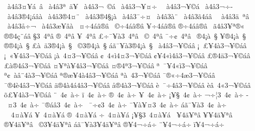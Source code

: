 {^^a0^^e04^^e23^^a4^^a5^^e1^^a0^^ad^^e2
^^a0^^e04^^e23^^aa^^a0^^e4^^a5
^^a0^^e04^^e23^^ac^^a0^^a9^^e1
^^a0^^e04^^e23^^ac^^a5^^a4^^f7^^a0
^^a0^^e04^^e23^^ac^^a5^^a9^^e1
^^a0^^e04^^e23^^ac^^f7^^ad
^^a0^^e04^^e23^^ae4^^a1^^e1^^e2^^e0
^^a0^^e04^^e23^^ae4^^a4^^a8^^ad
^^a0^^e04^^e23^^ae4^^a7^^a1^^e0
^^a0^^e04^^e23^^af^^f7^^a4
^^a0^^e04^^e23^^e0^^a8^^ad
^^a0^^e04^^e23^^e34^^e1^^e2^^a0^^ad
^^a0^^e04^^e23^^e4^^a0^^aa^^e2
^^a0^^e04^^e23^^e5^^f7^^ac
^^a0^^e04^^e23^^e6^^a5^^ad^^e2^^e0
^^ad^^a0^^a4^^f74^^e1^^e2^^ae^^e2
^^ad^^a0^^a9^^f74^^e1^^e2^^ae^^e2
^^a5^^f74^^e1^^e2^^ae^^e2
^^ae^^f74^^e1^^e2^^ae^^e2
^^a0^^e34^^e23^^a5^^aa^^ae^^ab
^^ae^^ae4^^e7^^a8^^e1^^e2
^^a73^^a04^^aa^^e2
^^ae^^a04^^aa^^e2
^^a5^^a04^^aa^^e2
^^a3^^f7^^af^^a5^^e03^^a04^^aa^^e2
^^ad^^a0^^a9^^a04^^aa^^e2 
^^af^^f7^^a2^^a04^^aa^^e2
^^a0^^ae4^^a1^^e0^^a0^^a7
^^a5^^ae4^^a1^^e0^^a0^^a7
^^ae^^ae4^^a1^^e0^^a0^^a7
^^a3^^e0^^a0^^e43^^ae4^^a1^^e0^^a0^^a7
^^ad^^a0^^a93^^ae4^^a1^^e0^^a0^^a7
^^e1^^e3^^af^^a5^^e03^^ae4^^a1^^e0^^a0^^a7
^^a0^^e04^^e23^^ac^^a5^^a9^^e1^^e2
^^a1^^a0^^a3^^a54^^e03^^ac^^a5^^a9^^e1^^e2
^^a1^^a0^^ab^^a54^^e23^^ac^^a5^^a9^^e1^^e2
^^a1^^e0^^a0^^ad4^^a43^^ac^^a5^^a9^^e1^^e2
^^a2^^a04^^ab^^ec4^^a43^^ac^^a5^^a9^^e1^^e2
^^a2^^a54^^ab^^ec4^^e23^^ac^^a5^^a9^^e1^^e2
^^a3^^ae4^^e43^^ac^^a5^^a9^^e1^^e2
^^a3^^e0^^ae4^^e13^^ac^^a5^^a9^^e1^^e2
^^a4^^a5^^aa^^e0^^a54^^e23^^ac^^a5^^a9^^e1^^e2
^^a4^^ae4^^aa3^^ac^^a5^^a9^^e1^^e2
^^aa^^a0^^af^^a54^^ab^^ec3^^ac^^a5^^a9^^e1^^e2
^^aa^^a2^^a0^^e0^^e2^^a84^^e03^^ac^^a5^^a9^^e1^^e2
^^aa^^ae^^ad^^e6^^a54^^e04^^e23^^ac^^a5^^a9^^e1^^e2
^^aa^^e0^^a04^^ad3^^ac^^a5^^a9^^e1^^e2
^^af^^ae^^ab^^f74^^e63^^ac^^a5^^a9^^e1^^e2
^^af^^ae4^^e84^^e23^^ac^^a5^^a9^^e1^^e2
^^e4^^ae4^^e04^^e14^^e23^^ac^^a5^^a9^^e1^^e2
^^e5^^ae4^^e03^^ac^^a5^^a9^^e1^^e2
^^e8^^a0^^af^^f74^^e23^^ac^^a5^^a9^^e1^^e2
^^e8^^e2^^a04^^ab3^^ac^^a5^^a9^^e1^^e2
^^f5^^a3^^a54^^e03^^ac^^a5^^a9^^e1^^e2
^^a8^^a04^^a2^^a0^^e0^^f7
^^ef^^a04^^a2^^a0^^e0^^f7
^^ae^^a04^^a2^^a0^^e0^^f7
^^a5^^a04^^a2^^a0^^e0^^f7
^^a1^^a5^^a7^^a04^^a2^^a0^^e0^^f7
^^ac^^f7^^a63^^a04^^a2^^a0^^e0^^f7
^^ad^^a0^^a43^^a04^^a2^^a0^^e0^^f7
^^af^^ae^^e1^^e23^^a04^^a2^^a0^^e0^^f7
^^ad^^a0^^af^^f7^^a23^^a04^^a2^^a0^^e0^^f7
^^af^^a5^^e0^^a5^^a43^^a04^^a2^^a0^^e0^^f7
^^e1^^e3^^af^^a5^^e03^^a04^^a2^^a0^^e0^^f7
^^a0^^a04^^a4^^e0^^a5^^e1
^^a5^^a04^^a4^^e0^^a5^^e1
^^ae^^a04^^a4^^e0^^a5^^e1
^^f7^^a04^^a4^^e0^^a5^^e1
^^a1^^a5^^a73^^a04^^a4^^e0^^a5^^e1
^^a0^^a54^^e4^^a5^^aa^^e2
^^a5^^a54^^e4^^a5^^aa^^e2
^^ae^^a54^^e4^^a5^^aa^^e2
^^ad^^a0^^a93^^a54^^e4^^a5^^aa^^e2
^^e1^^e3^^af^^a5^^e03^^a54^^e4^^a5^^aa^^e2
^^ae^^a54^^ac^^f7^^e1^^f7
^^a8^^a54^^ac^^f7^^e1^^f7
^^ef^^a54^^ac^^f7^^e1^^f7
}
